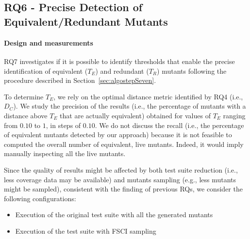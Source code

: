





\subsection{RQ6 - Precise Detection of Equivalent/Redundant Mutants}

\paragraph{Design and measurements}

RQ7 investigates if it is possible to identify thresholds that enable the precise identification of equivalent ($T_E$) and redundant ($T_R$) mutants following the procedure described in Section~\ref{sec:algostepSeven}.

To determine $T_E$, 
we rely on the optimal distance metric identified by RQ4 (i.e., {$D_C$}).
We study the precision of the results (i.e., the percentage of mutants with a distance above $T_E$ that are actually equivalent) obtained for  values of $T_E$ ranging from $0.10$ to $1$, in steps of $0.10$.
{We do not discuss the recall (i.e., the percentage of equivalent mutants detected by our approach) because it is not feasible to computed the overall number of equivalent, live mutants. Indeed, it would imply manually inspecting all the live mutants.}

Since the quality of results might be affected by both test suite reduction (i.e., less coverage data may be available) and mutants sampling (e.g., less mutants might be sampled), consistent with the finding of previous RQs, we consider the following configurations: 
\begin{itemize}
\item Execution of the original test suite with all the generated mutants
\item Execution of the \APPR test suite with FSCI sampling
\end{itemize}

